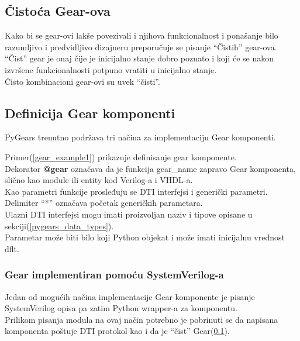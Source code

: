 \subsection{Čistoća Gear-ova} \label{gear_purity}

Kako bi se gear-ovi lakše povezivali i njihova funkcionalnost i ponašanje bilo
razumljivo i predvidljivo dizajneru preporučuje se pisanje ``Čistih''  gear-ova. \\
``Čist'' gear je onaj čije je inicijalno stanje dobro poznato i koji će se nakon
izvršene funkcionalnosti potpuno vratiti u inicijalno stanje. \\
Čisto kombinacioni gear-ovi su uvek ``čisti''.

\subsection{Definicija Gear komponenti}

PyGears trenutno podržava tri načina za implementaciju Gear komponenti.



Primer(\ref{gear_example1}) prikazuje definisanje gear komponente. \\
Dekorator \textbf{@gear} označava da je funkcija gear\_name zapravo Gear komponenta,
slično kao module ili entity kod Verilog-a i VHDL-a. \\
Kao parametri funkcije prosleđuju se DTI interfejsi i generički parametri.
Delimiter ``*'' označava početak generičkih parametara. \\

Ulazni DTI interfejsi mogu imati proizvoljan naziv i tipove opisane u
sekciji(\ref{pygears_data_types}). \\
Parametar može biti bilo koji Python objekat i može imati inicijalnu vrednost dflt.

\subsubsection{Gear implementiran pomoću SystemVerilog-a}

Jedan od mogućih načina implementacije Gear komponente je pisanje SystemVerilog
opisa pa zatim Python wrapper-a za komponentu. \\
Prilikom pisanja modula na ovaj način potrebno je pobrinuti se da napisana
komponenta poštuje DTI protokol kao i da je ``čist'' Gear(\ref{gear_purity}). \\

